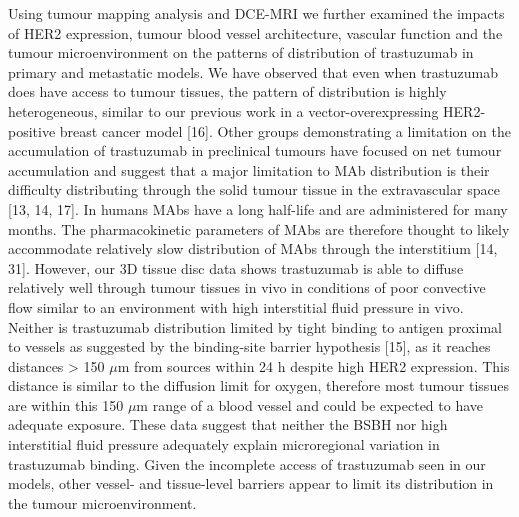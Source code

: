 Using tumour mapping analysis and DCE-MRI we further examined the impacts of HER2 expression, tumour blood vessel architecture, vascular function and the tumour microenvironment on the patterns of distribution of trastuzumab in primary and metastatic models.
We have observed that even when trastuzumab does have access to tumour tissues, the pattern of distribution is highly heterogeneous, similar to our previous work in a vector-overexpressing HER2-positive breast cancer model [16].
Other groups demonstrating a limitation on the accumulation of trastuzumab in preclinical tumours have focused on net tumour accumulation and suggest that a major limitation to \ac{MAb} distribution is their difficulty distributing through the solid tumour tissue in the extravascular space [13, 14, 17].
In humans \ac{MAbs} have a long half-life and are administered for many months.
The pharmacokinetic parameters of \ac{MAbs} are therefore thought to likely accommodate relatively slow distribution of \ac{MAbs} through the interstitium [14, 31].
However, our 3D tissue disc data shows trastuzumab is able to diffuse relatively well through tumour tissues in vivo in conditions of poor convective flow similar to an environment with high interstitial fluid pressure in vivo.
Neither is trastuzumab distribution limited by tight binding to antigen proximal to vessels as suggested by the binding-site barrier hypothesis [15], as it reaches distances > 150 $\mu$m from sources within 24 h despite high HER2 expression.
This distance is similar to the diffusion limit for oxygen, therefore most tumour tissues are within this 150 $\mu$m range of a blood vessel and could be expected to have adequate exposure.
These data suggest that neither the BSBH nor high interstitial fluid pressure adequately explain microregional variation in trastuzumab binding.
Given the incomplete access of trastuzumab seen in our models, other vessel- and tissue-level barriers appear to limit its distribution in the tumour microenvironment.

